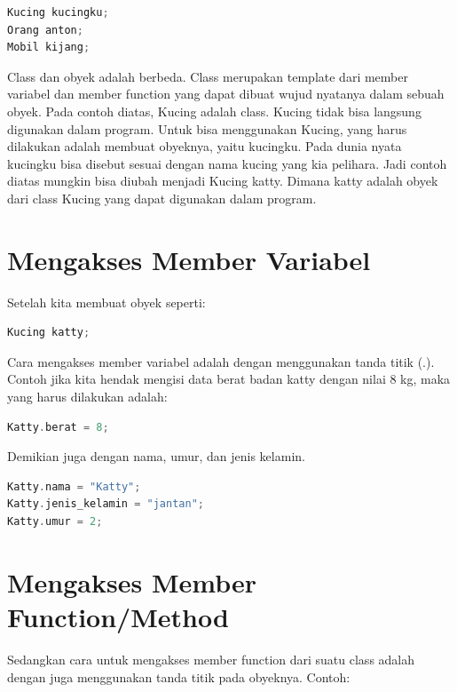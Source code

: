 \begin{lstlisting}[language=c++, numbers=none]
Kucing kucingku;
Orang anton;
Mobil kijang;
\end{lstlisting}

Class dan obyek adalah berbeda. Class merupakan template dari member
variabel dan member function yang dapat dibuat wujud nyatanya dalam
sebuah obyek. Pada contoh diatas, Kucing adalah class. Kucing tidak bisa
langsung digunakan dalam program. Untuk bisa menggunakan Kucing, yang
harus dilakukan adalah membuat obyeknya, yaitu kucingku. Pada dunia
nyata kucingku bisa disebut sesuai dengan nama kucing yang kia pelihara.
Jadi contoh diatas mungkin bisa diubah menjadi Kucing katty. Dimana
katty adalah obyek dari class Kucing yang dapat digunakan dalam program.

\section{Mengakses Member Variabel}\label{mengakses-member-variabel}

Setelah kita membuat obyek seperti:

\begin{lstlisting}[language=c++, numbers=none]
Kucing katty;
\end{lstlisting}

Cara mengakses member variabel adalah dengan menggunakan tanda titik
(.). Contoh jika kita hendak mengisi data berat badan katty dengan nilai
8 kg, maka yang harus dilakukan adalah:

\begin{lstlisting}[language=c++, numbers=none]
Katty.berat = 8;
\end{lstlisting}

Demikian juga dengan nama, umur, dan jenis kelamin.

\begin{lstlisting}[language=c++, numbers=none]
Katty.nama = "Katty";
Katty.jenis_kelamin = "jantan";
Katty.umur = 2;
\end{lstlisting}

\section{Mengakses Member
Function/Method}\label{mengakses-member-functionmethod}

Sedangkan cara untuk mengakses member function dari suatu class adalah
dengan juga menggunakan tanda titik pada obyeknya. Contoh:

